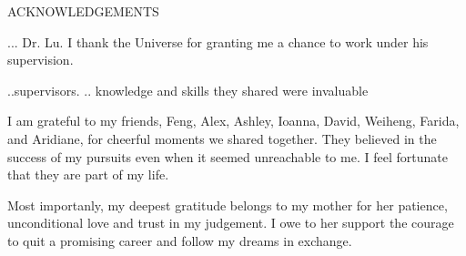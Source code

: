 \newpage
{}

\begin{center}
ACKNOWLEDGEMENTS
\end{center}

... Dr. Lu. I thank the Universe for granting me a chance to work under his supervision.

..supervisors. .. knowledge and skills they shared were invaluable

I am grateful to my friends, Feng, Alex, Ashley, Ioanna, David, Weiheng,  Farida, and Aridiane, 
 for cheerful moments we shared together. They believed in the success of my  pursuits even when it seemed unreachable to me. I feel fortunate that they are part of my life. 

Most importanly, my deepest gratitude belongs to my mother for her patience, unconditional love and trust in my judgement. %
I owe to her support the courage to quit a promising career and follow my dreams in exchange.
%
%
